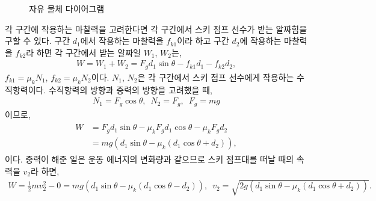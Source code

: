 \documentclass[floatfix,nofootinbib,superscriptaddress,fleqn]{revtex4-2}
\begin{document}
\begin{itemize}
\begin{figure}[h]
    \hspace{1cm}
     \caption{자유 물체 다이어그램}
  \end{figure}
  각 구간에 작용하는 마찰력을 고려한다면 각 구간에서 스키 점프 선수가 받는
  알짜힘을 구할 수 있다. 구간 $d_1$에서 작용하는 마찰력을 $f_{k1}$이라 하고 
  구간 $d_2$에 작용하는 마찰력을 $f_{k2}$라 하면 각 구간에서 받는 알짜일 
  $W_1$, $W_2$는,
  \begin{align}
    W = W_1+W_2 = F_g d_1\sin{\theta}
    -f_{k1}d_1-f_{k2}d_2,
  \end{align} 
  $f_{k1}=\mu_kN_1$, $f_{k2}=\mu_kN_2$이다.
  $N_1$, $N_2$은 각 구간에서 스키 점프 선수에게 작용하는 수직항력이다. 
  수직항력의 방향과 중력의 방향을 고려했을 때,
  \begin{align}\label{eq:5-1}
    N_1 = F_g\cos{\theta},\,\,\,N_2=F_g,\,\,\,F_g=mg
  \end{align}
  이므로,
  \begin{align}
    \begin{split}
      W &= F_g d_1\sin{\theta}
      -\mu_kF_gd_1\cos{\theta}-\mu_kF_gd_2  \\
      &= mg\left( d_1\sin{\theta}-\mu_k(d_1\cos{\theta}+d_2) \right),
    \end{split}
  \end{align}
  이다. 중력이 해준 일은 운동 에너지의 변화량과 같으므로 
  스키 점프대를 떠날 때의 속력을 $v_2$라 하면,
  \begin{align}
      W = \frac{1}{2}mv^2_2 -0
      =mg\left(d_1\sin{\theta}-\mu_k(d_1\cos{\theta}
      -d_2)\right),\,\,\,
      v_2=\sqrt{2g\left( d_1\sin{\theta}
      -\mu_k(d_1\cos{\theta}+d_2)\right)}.

\end{align}
\end{itemize}
\end{document}
